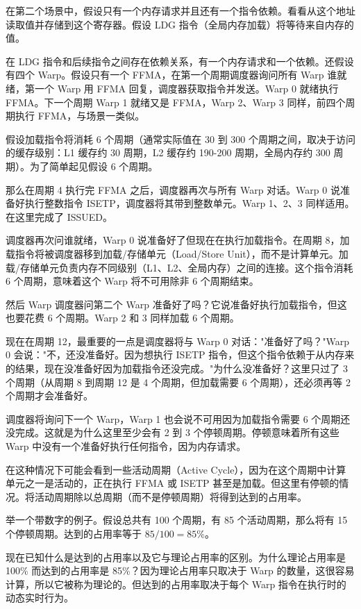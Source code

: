 在第二个场景中，假设只有一个内存请求并且还有一个指令依赖。看看从这个地址读取值并存储到这个寄存器。假设 LDG 指令（全局内存加载）将等待来自内存的值。

在 LDG 指令和后续指令之间存在依赖关系，有一个内存请求和一个依赖。还假设有四个 Warp。假设只有一个 FFMA，在第一个周期调度器询问所有 Warp 谁就绪，第一个 Warp 用 FFMA 回复，调度器获取指令并发送。Warp 0 就绪执行 FFMA。下一个周期 Warp 1 就绪又是 FFMA，Warp 2、Warp 3 同样，前四个周期执行 FFMA，与场景一类似。

假设加载指令将消耗 6 个周期（通常实际值在 30 到 300 个周期之间，取决于访问的缓存级别：L1 缓存约 30 周期，L2 缓存约 190-200 周期，全局内存约 300 周期）。为了简单起见假设 6 个周期。

那么在周期 4 执行完 FFMA 之后，调度器再次与所有 Warp 对话。Warp 0 说准备好执行整数指令 ISETP，调度器将其带到整数单元。Warp 1、2、3 同样适用。在这里完成了 ISSUED。

调度器再次问谁就绪，Warp 0 说准备好了但现在在执行加载指令。在周期 8，加载指令将被调度器移到加载/存储单元（Load/Store Unit），而不是计算单元。加载/存储单元负责内存不同级别（L1、L2、全局内存）之间的连接。这个指令消耗 6 个周期，意味着这个 Warp 将不可用除非 6 个周期结束。

然后 Warp 调度器问第二个 Warp 准备好了吗？它说准备好执行加载指令，但这也要花费 6 个周期。Warp 2 和 3 同样加载 6 个周期。

现在在周期 12，最重要的一点是调度器将与 Warp 0 对话："准备好了吗？"Warp 0 会说："不，还没准备好。因为想执行 ISETP 指令，但这个指令依赖于从内存来的结果，现在没准备好因为加载指令还没完成。"为什么没准备好？这里只过了 3 个周期（从周期 8 到周期 12 是 4 个周期，但加载需要 6 个周期），还必须再等 2 个周期才会准备好。

调度器将询问下一个 Warp，Warp 1 也会说不可用因为加载指令需要 6 个周期还没完成。这就是为什么这里至少会有 2 到 3 个停顿周期。停顿意味着所有这些 Warp 中没有一个准备好执行任何指令，因为内存请求。

在这种情况下可能会看到一些活动周期（Active Cycle），因为在这个周期中计算单元之一是活动的，正在执行 FFMA 或 ISETP 甚至是加载。但这里有停顿的情况。将活动周期除以总周期（而不是停顿周期）将得到达到的占用率。

举一个带数字的例子。假设总共有 100 个周期，有 85 个活动周期，那么将有 15 个停顿周期。达到的占用率等于 $85 / 100 = 85\%$。

现在已知什么是达到的占用率以及它与理论占用率的区别。为什么理论占用率是 100\% 而达到的占用率是 85\%？因为理论占用率只取决于 Warp 的数量，这很容易计算，所以它被称为理论的。但达到的占用率取决于每个 Warp 指令在执行时的动态实时行为。

